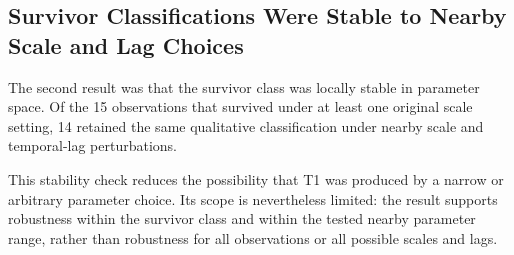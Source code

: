 \subsection{Survivor Classifications Were Stable to Nearby Scale and Lag Choices}

The second result was that the survivor class was locally stable in parameter
space. Of the 15 observations that survived under at least one original scale
setting, 14 retained the same qualitative classification under nearby scale
and temporal-lag perturbations.

This stability check reduces the possibility that T1 was produced by a narrow
or arbitrary parameter choice. Its scope is nevertheless limited: the result
supports robustness within the survivor class and within the tested nearby
parameter range, rather than robustness for all observations or all possible
scales and lags.
